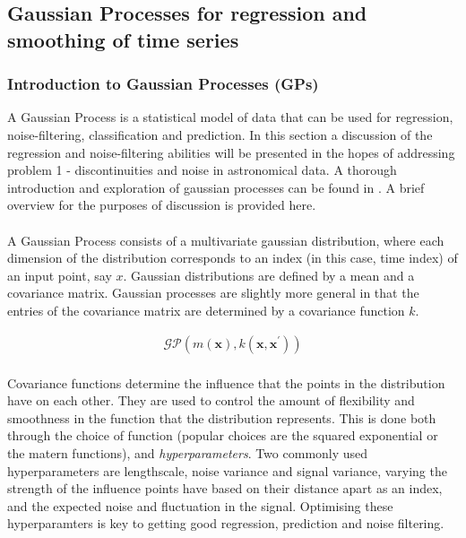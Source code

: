 \documentclass[11pt]{article}
\begin{document}
	\subsection{Gaussian Processes for regression and smoothing of time series}
	\subsubsection{Introduction to Gaussian Processes (GPs)}
	A Gaussian Process is a statistical model of data that can be used for regression, noise-filtering, classification and prediction. In this section a discussion of the regression and noise-filtering abilities will be presented in the hopes of addressing problem 1 - discontinuities and noise in astronomical data. A thorough introduction and exploration of gaussian processes can be found in \citep{rasmussen2006gpfml}. A brief overview for the purposes of discussion is provided here.
	\paragraph{}
	A Gaussian Process consists of a multivariate gaussian distribution, where each dimension of the distribution corresponds to an index (in this case, time index) of an input point, say $x$. Gaussian distributions are defined by a mean and a covariance matrix. Gaussian processes are slightly more general in that the entries of the covariance matrix are determined by a covariance function $k$. 
	\begin{center}
	\begin{align*}
		\mathcal{GP}(m(\mathbf{x}), k(\mathbf{x}, \mathbf{x}^{\prime})) \\
	\end{align*}
	\end{center}
	Covariance functions determine the influence that the points in the distribution have on each other. They are used to control the amount of flexibility and smoothness in the function that the distribution represents. This is done both through the choice of function (popular choices are the squared exponential or the matern functions), and \emph{hyperparameters}. Two commonly used hyperparameters are lengthscale, noise variance and signal variance, varying the strength of the influence points have based on their distance apart as an index, and the expected noise and fluctuation in the signal. Optimising these hyperparamters is key to getting good regression, prediction and noise filtering.
	
\end{document}

